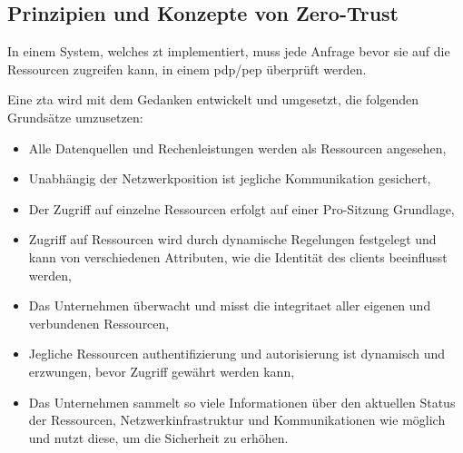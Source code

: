 \subsection{Prinzipien und Konzepte von Zero-Trust}\label{subsec:prinzipien-und-konzepte-von-zero-trust}
In einem System, welches \ac{zt} implementiert, muss jede Anfrage bevor sie auf die Ressourcen zugreifen kann, in einem \gls{pdp}/\gls{pep} überprüft werden\autocite[\vglf][]{NIST:800207}.

Eine \ac{zta} wird mit dem Gedanken entwickelt und umgesetzt, die folgenden Grundsätze umzusetzen:
\begin{itemize}
    \item Alle Datenquellen und Rechenleistungen werden als Ressourcen angesehen,
    \item Unabhängig der Netzwerkposition ist jegliche Kommunikation gesichert,
    \item Der Zugriff auf einzelne Ressourcen erfolgt auf einer Pro-Sitzung Grundlage,
    \item Zugriff auf Ressourcen wird durch dynamische Regelungen festgelegt und kann von verschiedenen Attributen, wie die Identität des \glspl{client} beeinflusst werden,
    \item Das Unternehmen überwacht und misst die \gls{integritaet} aller eigenen und verbundenen Ressourcen,
    \item Jegliche Ressourcen \gls{authentifizierung} und \gls{autorisierung} ist dynamisch und erzwungen, bevor Zugriff gewährt werden kann,
    \item Das Unternehmen sammelt so viele Informationen über den aktuellen Status der Ressourcen, Netzwerkinfrastruktur und Kommunikationen wie möglich und nutzt diese, um die Sicherheit zu erhöhen.\autocite[\vglf][-7]{NIST:800207}
\end{itemize}
